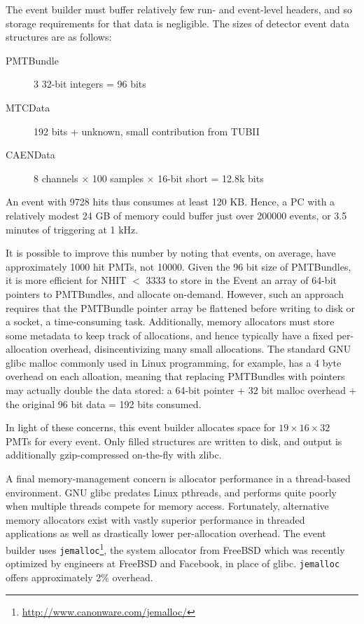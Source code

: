 \documentclass[11pt,twocolumn]{article}
\begin{document}
The event builder must buffer relatively few run- and event-level headers, and so storage requirements for that data is negligible. The sizes of detector event data structures are as follows:
\begin{description}
\item[PMTBundle] 3 32-bit integers = 96 bits
\item[MTCData] 192 bits + unknown, small contribution from TUBII
\item[CAENData] 8 channels $\times$ 100 samples $\times$ 16-bit short = 12.8k bits
\end{description}
An event with 9728 hits thus consumes at least 120 KB. Hence, a PC with a relatively modest 24 GB of memory could buffer just over 200000 events, or 3.5 minutes of triggering at 1 kHz.

It is possible to improve this number by noting that events, on average, have approximately 1000 hit PMTs, not 10000. Given the 96 bit size of PMTBundles, it is more efficient for NHIT $<$ 3333 to store in the Event an array of 64-bit pointers to PMTBundles, and allocate on-demand. However, such an approach requires that the PMTBundle pointer array be flattened before writing to disk or a socket, a time-consuming task. Additionally, memory allocators must store some metadata to keep track of allocations, and hence typically have a fixed per-allocation overhead, disincentivizing many small allocations. The standard GNU glibc malloc commonly used in Linux programming, for example, has a 4 byte overhead on each alloation, meaning that replacing PMTBundles with pointers may actually double the data stored: a 64-bit pointer + 32 bit malloc overhead + the original 96 bit data = 192 bits consumed.

In light of these concerns, this event builder allocates space for $19\times16\times32$ PMTs for every event. Only filled structures are written to disk, and output is additionally gzip-compressed on-the-fly with zlibc.

A final memory-management concern is allocator performance in a thread-based environment. GNU glibc predates Linux pthreads, and performs quite poorly when multiple threads compete for memory access. Fortunately, alternative memory allocators exist with vastly superior performance in threaded applications as well as drastically lower per-allocation overhead. The event builder uses {\tt jemalloc}\footnote{\href{http://www.canonware.com/jemalloc/}{http://www.canonware.com/jemalloc/}}, the system allocator from FreeBSD which was recently optimized by engineers at FreeBSD and Facebook, in place of glibc. {\tt jemalloc} offers approximately 2\% overhead.
\end{document}
